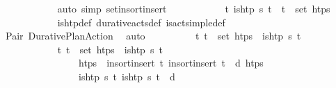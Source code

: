 \begin{isabellebody}
\ \ \ \ \ \ \ \ \ \ \isamarkupfalse%
\ {\isacharparenleft}{\kern0pt}auto\ simp{\isacharcolon}{\kern0pt}\ set{\isacharunderscore}{\kern0pt}insort{\isacharunderscore}{\kern0pt}insert{\isacharparenright}{\kern0pt}\isanewline
\ \ \ \ \ \ \ \ \isamarkupfalse%
\ \isamarkupfalse%
\ {\isachardoublequoteopen}{\isasymforall}t{\isachardot}{\kern0pt}\ is{\isacharunderscore}{\kern0pt}htp\ {\isacharparenleft}{\kern0pt}{\isasympi}{\isacharhash}{\kern0pt}{\isasympi}s{\isacharparenright}{\kern0pt}\ t\ {\isasymlongrightarrow}\ t\ {\isasymin}\ set\ htps{\isachardoublequoteclose}\isanewline
\ \ \ \ \ \ \ \ \ \ \isamarkupfalse%
\ is{\isacharunderscore}{\kern0pt}htp{\isacharunderscore}{\kern0pt}def\ durative{\isacharunderscore}{\kern0pt}acts{\isacharunderscore}{\kern0pt}def\ is{\isacharunderscore}{\kern0pt}act{\isacharunderscore}{\kern0pt}simple{\isacharunderscore}{\kern0pt}def\isanewline
\ \ \ \ \ \ \ \ \ \ \isamarkupfalse%
\ Pair\ Durative{\isacharunderscore}{\kern0pt}Plan{\isacharunderscore}{\kern0pt}Action\ \isamarkupfalse%
\ auto\isanewline
\ \ \ \ \ \ \ \ \isamarkupfalse%
\ {\isachardoublequoteopen}{\isasymforall}t{\isachardot}{\kern0pt}\ t\ {\isasymin}\ set\ htps\ {\isasymlongrightarrow}\ is{\isacharunderscore}{\kern0pt}htp\ {\isacharparenleft}{\kern0pt}{\isasympi}{\isacharhash}{\kern0pt}{\isasympi}s{\isacharparenright}{\kern0pt}\ t{\isachardoublequoteclose}\isanewline
\ \ \ \ \ \ \ \ \ \ \isamarkupfalse%
\ {\isacartoucheopen}{\isasymforall}t{\isachardot}{\kern0pt}\ t\ {\isasymin}\ set\ htps{\isacharprime}{\kern0pt}\ {\isasymlongrightarrow}\ is{\isacharunderscore}{\kern0pt}htp\ {\isacharparenleft}{\kern0pt}{\isasympi}{\isacharhash}{\kern0pt}{\isasympi}s{\isacharparenright}{\kern0pt}\ t{\isacartoucheclose}\ \isanewline
\ \ \ \ \ \ \ \ \ \ \ \ \ \ \ \ {\isacartoucheopen}htps\ {\isacharequal}{\kern0pt}\ insort{\isacharunderscore}{\kern0pt}insert\ t\isactrlsub {\isasympi}\ {\isacharparenleft}{\kern0pt}insort{\isacharunderscore}{\kern0pt}insert\ {\isacharparenleft}{\kern0pt}t\isactrlsub {\isasympi}\ {\isacharplus}{\kern0pt}\ d{\isacharparenright}{\kern0pt}\ htps{\isacharprime}{\kern0pt}{\isacharparenright}{\kern0pt}{\isacartoucheclose}\ \isanewline
\ \ \ \ \ \ \ \ \ \ \ \ \ \ \ \ {\isacartoucheopen}is{\isacharunderscore}{\kern0pt}htp\ {\isacharparenleft}{\kern0pt}{\isasympi}{\isacharhash}{\kern0pt}{\isasympi}s{\isacharparenright}{\kern0pt}\ t\isactrlsub {\isasympi}{\isacartoucheclose}\ {\isacartoucheopen}is{\isacharunderscore}{\kern0pt}htp\ {\isacharparenleft}{\kern0pt}{\isasympi}{\isacharhash}{\kern0pt}{\isasympi}s{\isacharparenright}{\kern0pt}\ {\isacharparenleft}{\kern0pt}t\isactrlsub {\isasympi}\ {\isacharplus}{\kern0pt}\ d{\isacharparenright}{\kern0pt}{\isacartoucheclose}\isanewline

\end{isabellebody}
